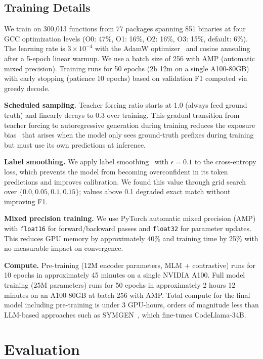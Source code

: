 \documentclass[sigconf,nonacm]{acmart}
\begin{document}
\subsection{Training Details}
\label{sec:training}

We train on 300{,}013 functions from 77 packages spanning 851 binaries at four GCC optimization levels (O0: 47\%, O1: 16\%, O2: 16\%, O3: 15\%, default: 6\%). The learning rate is $3 \times 10^{-4}$ with the AdamW optimizer~\cite{adamw} and cosine annealing~\cite{sgdr} after a 5-epoch linear warmup. We use a batch size of 256 with AMP (automatic mixed precision). Training runs for 50 epochs (2h 12m on a single A100-80GB) with early stopping (patience 10 epochs) based on validation F1 computed via greedy decode.

\textbf{Scheduled sampling.} Teacher forcing ratio starts at 1.0 (always feed ground truth) and linearly decays to 0.3 over training. This gradual transition from teacher forcing to autoregressive generation during training reduces the exposure bias~\cite{bengio2015scheduled} that arises when the model only sees ground-truth prefixes during training but must use its own predictions at inference.

\textbf{Label smoothing.} We apply label smoothing~\cite{labelsmooth} with $\epsilon = 0.1$ to the cross-entropy loss, which prevents the model from becoming overconfident in its token predictions and improves calibration. We found this value through grid search over $\{0.0, 0.05, 0.1, 0.15\}$; values above 0.1 degraded exact match without improving F1.

\textbf{Mixed precision training.} We use PyTorch automatic mixed precision (AMP) with \texttt{float16} for forward/backward passes and \texttt{float32} for parameter updates. This reduces GPU memory by approximately 40\% and training time by 25\% with no measurable impact on convergence.

\textbf{Compute.} Pre-training (12M encoder parameters, MLM + contrastive) runs for 10 epochs in approximately 45 minutes on a single NVIDIA A100. Full model training (25M parameters) runs for 50 epochs in approximately 2 hours 12 minutes on an A100-80GB at batch 256 with AMP. Total compute for the final model including pre-training is under 3 GPU-hours, orders of magnitude less than LLM-based approaches such as SYMGEN~\cite{symgen}, which fine-tunes CodeLlama-34B.

\section{Evaluation}
\label{sec:eval}
\end{document}
